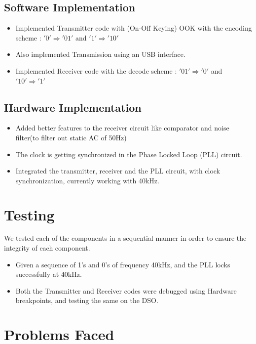 \documentclass{article}
\begin{document}
\subsection{Software Implementation}
\begin{itemize}
\item Implemented Transmitter code with (On-Off Keying) OOK with the encoding scheme : $'0' \Rightarrow '01'$ and $'1' \Rightarrow '10'$
\item Also implemented Transmission using an USB interface.
\item Implemented Receiver code with the decode scheme : $'01' \Rightarrow '0'$ and $'10' \Rightarrow '1'$
\end{itemize}

\subsection{Hardware Implementation}
\begin{itemize}
\item Added better features to the receiver circuit like comparator and noise filter(to filter out static AC of 50Hz)
\item The clock is getting synchronized in the Phase Locked Loop (PLL) circuit.
\item Integrated the transmitter, receiver and the PLL circuit, with clock synchronization, currently working with 40kHz.
\end{itemize}

\section{Testing}

We tested each of the components in a sequential manner in order to ensure the integrity of each component.
\begin{itemize}
\item Given a sequence of 1's and 0's of frequency 40kHz, and the PLL locks successfully at 40kHz.
\item Both the Transmitter and Receiver codes were debugged using Hardware breakpoints, and testing the same on the DSO.
\end{itemize}

\section{Problems Faced}
\end{document}

